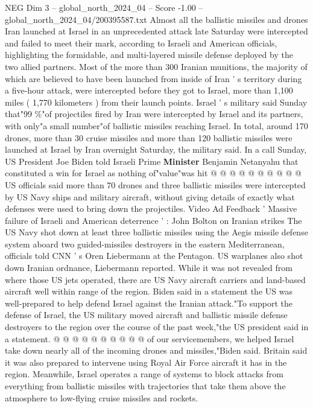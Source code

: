 \begin{textsample}{NEG Dim 3 – global\_north\_2024\_04 – Score -1.00 – global\_north\_2024\_04/200395587.txt}  \label{ex:f3_neg_385}
Almost all the ballistic missiles and drones Iran launched at Israel in an unprecedented attack late Saturday were intercepted and failed to meet their mark, according to Israeli and American officials, highlighting the formidable, and multi-layered missile defense deployed by the two allied partners.
Most of the more than 300 Iranian munitions, the majority of which are believed to have been launched from inside of Iran ' s territory during a five-hour attack, were intercepted before they got to Israel, more than 1,100 miles ( 1,770 kilometers ) from their launch points.
Israel ' s military said Sunday that"99 \%"of projectiles fired by Iran were intercepted by Israel and its partners, with only"a small number"of ballistic missiles reaching Israel.
In total, around 170 drones, more than 30 cruise missiles and more than 120 ballistic missiles were launched at Israel by Iran overnight Saturday, the military said.
In a call Sunday, US President Joe Biden told Israeli Prime \textbf{Minister} Benjamin Netanyahu that constituted a win for Israel as nothing of"value"was hit @ @ @ @ @ @ @ @ @ @ US officials said more than 70 drones and three ballistic missiles were intercepted by US Navy ships and military aircraft, without giving details of exactly what defenses were used to bring down the projectiles.
Video Ad Feedback ' Massive failure of Israeli and American deterrence ' : John Bolton on Iranian strikes The US Navy shot down at least three ballistic missiles using the Aegis missile defense system aboard two guided-missiles destroyers in the eastern Mediterranean, officials told CNN ' s Oren Liebermann at the Pentagon.
US warplanes also shot down Iranian ordnance, Liebermann reported.
While it was not revealed from where those US jets operated, there are US Navy aircraft carriers and land-based aircraft well within range of the region.
Biden said in a statement the US was well-prepared to help defend Israel against the Iranian attack."To support the defense of Israel, the US military moved aircraft and ballistic missile defense destroyers to the region over the course of the past week,"the US president said in a statement. @ @ @ @ @ @ @ @ @ @ of our servicemembers, we helped Israel take down nearly all of the incoming drones and missiles,"Biden said.
Britain said it was also prepared to intervene using Royal Air Force aircraft it has in the region.
Meanwhile, Israel operates a range of systems to block attacks from everything from ballistic missiles with trajectories that take them above the atmosphere to low-flying cruise missiles and rockets.

\end{textsample}
